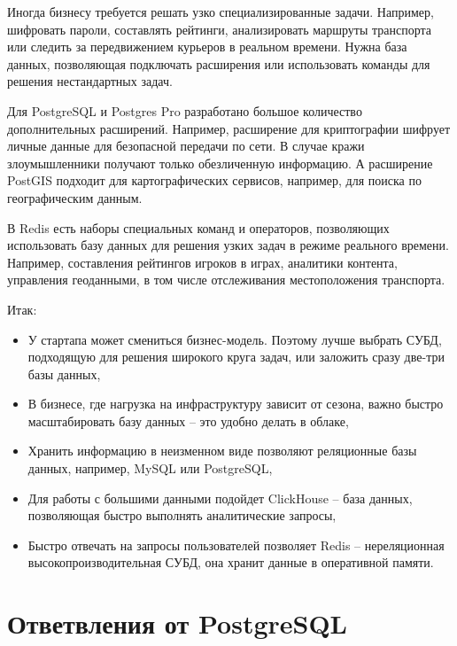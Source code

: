 \documentclass[%
	11pt,
	a4paper,
	utf8,
		]{article}
\begin{document}
Иногда бизнесу требуется решать узко специализированные задачи. Например, шифровать пароли, составлять рейтинги, анализировать маршруты транспорта или следить за передвижением курьеров в реальном времени. Нужна база данных, позволяющая подключать расширения или использовать команды для решения нестандартных задач. 

Для PostgreSQL и Postgres Pro разработано большое количество дополнительных расширений. Например, расширение для криптографии шифрует личные данные для безопасной передачи по сети. В случае кражи злоумышленники получают только обезличенную информацию. А расширение PostGIS подходит для картографических сервисов, например, для поиска по географическим данным.

В Redis есть наборы специальных команд и операторов, позволяющих использовать базу данных для решения узких задач в режиме реального времени. Например, составления рейтингов игроков в играх, аналитики контента, управления геоданными, в том числе отслеживания местоположения транспорта.

Итак:
\begin{itemize}
	\item У стартапа может смениться бизнес-модель. Поэтому лучше выбрать СУБД, подходящую для решения широкого круга задач, или заложить сразу две-три базы данных,
	
	\item В бизнесе, где нагрузка на инфраструктуру зависит от сезона, важно быстро масштабировать базу данных -- это удобно делать в облаке,
	
	\item Хранить информацию в неизменном виде позволяют реляционные базы данных, например, MySQL или PostgreSQL,
	
	\item Для работы с большими данными подойдет ClickHouse -- база данных, позволяющая быстро выполнять аналитические запросы,
	
	\item Быстро отвечать на запросы пользователей позволяет Redis -- нереляционная высокопроизводительная СУБД, она хранит данные в оперативной памяти.
\end{itemize}

\section{Ответвления от PostgreSQL}
\end{document}
